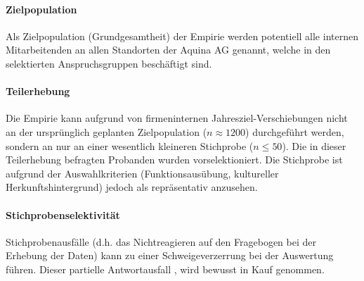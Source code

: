\documentclass[../../main.tex]{subfiles}
\begin{document}
\paragraph*{Zielpopulation}\mbox{}

\begin{sloppypar}
Als Zielpopulation (Grundgesamtheit) der Empirie werden potentiell alle internen Mitarbeitenden an allen Standorten der Aquina AG genannt, welche in den selektierten Anspruchsgruppen beschäftigt sind.
\end{sloppypar}

\paragraph*{Teilerhebung}\mbox{}

\begin{sloppypar}
Die Empirie kann aufgrund von firmeninternen Jahresziel-Verschiebungen nicht an der ursprünglich geplanten Zielpopulation ($n \approx 1200$) durchgeführt werden, sondern an nur an einer wesentlich kleineren Stichprobe ($n \leq 50$). Die in dieser Teilerhebung befragten Probanden wurden vorselektioniert. Die Stichprobe ist aufgrund der Auswahlkriterien (Funktionsausübung, kultureller Herkunftshintergrund) jedoch als repräsentativ anzusehen.
\end{sloppypar}

\paragraph*{Stichprobenselektivität}\mbox{}

\begin{sloppypar}
Stichprobenausfälle (d.h. das Nichtreagieren auf den Fragebogen bei der Erhebung der Daten) kann zu einer Schweigeverzerrung bei der Auswertung führen. Dieser partielle Antwortausfall , wird bewusst in Kauf genommen. 
\end{sloppypar}
\end{document}
